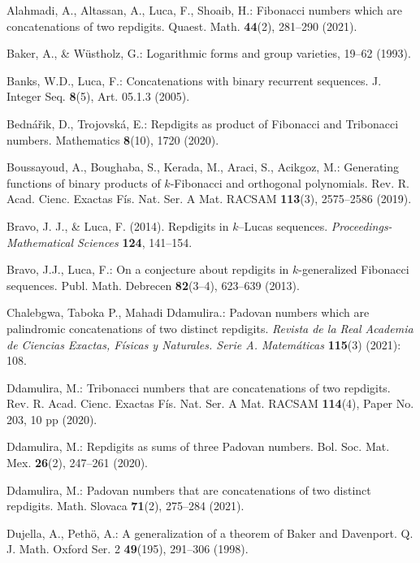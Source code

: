 \begin{thebibliography}{99}
	
	Alahmadi, A., Altassan, A., Luca, F., Shoaib, H.: Fibonacci numbers which are concatenations of two repdigits. Quaest. Math. \textbf{44}(2), 281--290 (2021).
	
	Baker, A., \& Wüstholz, G.: Logarithmic forms and group varieties, 19--62  (1993).
	
	Banks, W.D., Luca, F.: Concatenations with binary recurrent sequences. J. Integer Seq. \textbf{8}(5), Art. 05.1.3 (2005).
	
	Bedná\v rik, D., Trojovská, E.: Repdigits as product of Fibonacci and Tribonacci numbers. Mathematics \textbf{8}(10), 1720 (2020).
	
	Boussayoud, A., Boughaba, S., Kerada, M., Araci, S., Acikgoz, M.: Generating functions of binary products of \( k \)-Fibonacci and orthogonal polynomials. Rev. R. Acad. Cienc. Exactas Fís. Nat. Ser. A Mat. RACSAM \textbf{113}(3), 2575--2586 (2019).
	
	Bravo, J. J., \& Luca, F. (2014). Repdigits in $k$--Lucas sequences. {\it Proceedings-Mathematical Sciences\/} {\bf 124}, 141--154.
	
	Bravo, J.J., Luca, F.: On a conjecture about repdigits in \( k \)-generalized Fibonacci sequences. Publ. Math. Debrecen \textbf{82}(3--4), 623--639 (2013).
	
	Chalebgwa, Taboka P., Mahadi Ddamulira.: Padovan numbers which are palindromic concatenations of two distinct repdigits. \textit{Revista de la Real Academia de Ciencias Exactas, Físicas y Naturales. Serie A. Matemáticas} \textbf{115}(3) (2021): 108.
		
	Ddamulira, M.: Tribonacci numbers that are concatenations of two repdigits. Rev. R. Acad. Cienc. Exactas Fís. Nat. Ser. A Mat. RACSAM \textbf{114}(4), Paper No. 203, 10 pp (2020).
	
	Ddamulira, M.: Repdigits as sums of three Padovan numbers. Bol. Soc. Mat. Mex. \textbf{26}(2), 247--261 (2020). 
	
	Ddamulira, M.: Padovan numbers that are concatenations of two distinct repdigits. Math. Slovaca \textbf{71}(2), 275--284 (2021).
	
	Dujella, A., Peth\"o, A.: A generalization of a theorem of Baker and Davenport. Q. J. Math. Oxford Ser. 2 \textbf{49}(195), 291--306 (1998).
	

\end{thebibliography}
